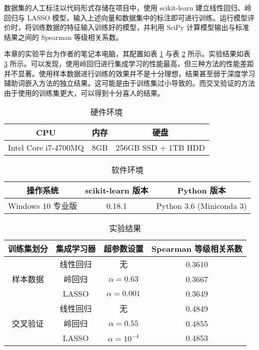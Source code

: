 数据集的人工标注以代码形式存储在项目中，使用 scikit-learn 建立线性回归、岭回归与 LASSO 模型，输入上述向量和数据集中的标注即可进行训练。运行模型评价时，将训练数据的特征输入训练好的模型，并利用 SciPy 计算模型输出与标准结果之间的 Spearman 等级相关系数。

本章的实验平台为作者的笔记本电脑，其配置如表 \ref{t:local hw environment} 与表 \ref{t:local sw environment} 所示。实验结果如表 \ref{t:ensemble result} 所示。可以发现，使用岭回归进行集成学习的性能最高，但三种方法的性能差距并不显著。使用样本数据进行训练的效果并不是十分理想，结果甚至弱于深度学习辅助词嵌入方法的独立结果。这可能是由于训练集过小导致的。而交叉验证的方法由于使用的训练集更大，可以得到十分喜人的结果。

\begin{table}[h]
	\caption{硬件环境}
	\label{t:local hw environment}
	\vspace{0.5em}\centering\wuhao
	\begin{tabular}{ccc}
		\toprule[1.5pt]
		CPU & 内存 & 硬盘 \\
		\midrule[1pt]
		Intel Core i7-4700MQ & 8GB& 256GB SSD + 1TB HDD \\
		\bottomrule[1.5pt]
	\end{tabular}
\end{table}

\begin{table}[h]
\caption{软件环境}
\label{t:local sw environment}
\vspace{0.5em}\centering\wuhao
\begin{tabular}{ccc}
	\toprule[1.5pt]
	操作系统 & scikit-learn 版本 & Python 版本 \\
	\midrule[1pt]
	Windows 10 专业版 & 0.18.1 & Python 3.6 (Miniconda 3) \\
	\bottomrule[1.5pt]
\end{tabular}
\end{table}

\begin{table}[H]
	\caption{实验结果}
	\label{t:ensemble result}
	\vspace{0.5em}\centering\wuhao
	\begin{tabular}{cccc}
		\toprule[1.5pt]
		训练集划分 & 集成学习器 & 超参数设置 & Spearman 等级相关系数 \\
		\midrule[1pt]
		\multirow{3}{*}{样本数据} & 线性回归 & 无 & 0.3610 \\
		& 岭回归 & $\alpha = 0.63$ & 0.3667 \\
		& LASSO & $\alpha = 0.001$ & 0.3649 \\
		\hline
		\multirow{3}{*}{交叉验证} & 线性回归 & 无 & 0.4849 \\
		& 岭回归 & $\alpha = 0.55$ & 0.4855 \\
		& LASSO & $\alpha = 10^{-4}$ & 0.4853 \\
		\bottomrule[1.5pt]
	\end{tabular}
\end{table}
